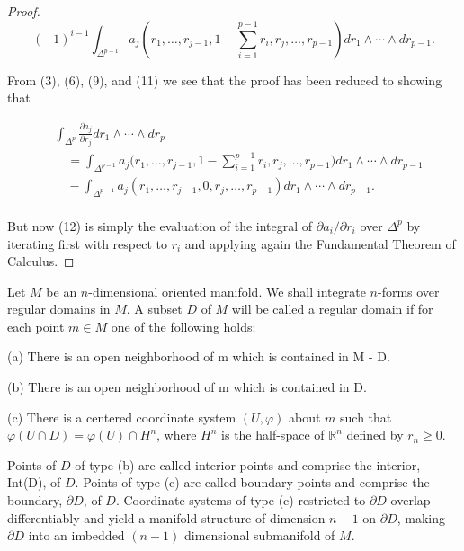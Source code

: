 \begin{proof}
\[
(-1)^{i-1}\int_{\Delta^{p-1}}a_{j}\left(r_{1},\ldots,r_{j-1},1-\sum_{i=1}^{p-1}r_{i},r_{j},\ldots,r_{p-1}\right)d r_{1}\wedge\cdots\wedge d r_{p-1}.
\]

From (3), (6), (9), and (11) we see that the proof has been reduced to showing that

\begin{equation}
\tag{9}\label{eq:4.7:9}
\begin{aligned}{}&{{}\int_{\Delta^{p}}\frac{\partial a_{j}}{\partial r_{j}}d r_{1}\wedge\cdots\wedge d r_{p}}\\ {}&{{}\quad=\int_{\Delta^{p-1}}a_{j}\bigg(r_{1},\ldots,r_{j-1},1-\sum_{i=1}^{p-1}r_{i},r_{j},\ldots,r_{p-1}\bigg)d r_{1}\wedge\cdots\wedge d r_{p-1}}\\ {}&{{}\quad-\int_{\Delta^{p-1}}a_{j}(r_{1},\ldots,r_{j-1},0,r_{j},\ldots,r_{p-1})d r_{1}\wedge\cdots\wedge d r_{p-1}.}\\ \end{aligned}
\end{equation}

But now (12) is simply the evaluation of the integral of $\partial a_{i}/\partial r_{i}$ over $\Delta^{p}$ by iterating first with respect to $r_{i}$ and applying again the Fundamental Theorem of Calculus.

\end{proof}

\label{thm:4.8}
Let $M$ be an $n$-dimensional oriented manifold. We shall integrate $n$-forms over regular domains in $M$. A subset $D$ of $M$ will be called a regular domain if for each point $m \in M$ one of the following holds: 

(a) There is an open neighborhood of m which is contained in M - D.

(b) There is an open neighborhood of m which is contained in D.

(c) There is a centered coordinate system $(U,\varphi)$ about $m$ such that $\varphi(U\cap D)=\varphi(U)\cap H^n$, where $H^n$ is the half-space of $\mathbb{R}^n$ defined by $r_n\geq0$.

Points of $D$ of type (b) are called interior points and comprise the interior, Int(D), of $D$. Points of type (c) are called boundary points and comprise the boundary, $\partial D$, of $D$. Coordinate systems of type (c) restricted to $\partial D$ overlap differentiably and yield a manifold structure of dimension $n-1$ on $\partial D$, making $\partial D$ into an imbedded $(n-1)$ dimensional submanifold of $M$.

